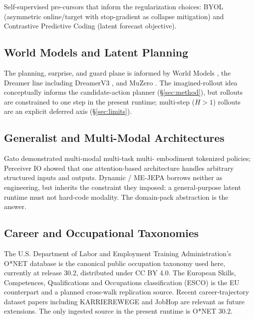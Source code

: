 \documentclass[10pt,twocolumn,letterpaper]{article}
\begin{document}
Self-supervised pre-cursors that inform the regularization choices:
BYOL \cite{grill2020byol} (asymmetric online/target with
stop-gradient as collapse mitigation) and Contrastive Predictive
Coding \cite{vandenoord2019cpc} (latent forecast objective).

\subsection{World Models and Latent Planning}

The planning, surprise, and guard plane is informed by World Models
\cite{ha2018worldmodels}, the Dreamer line including DreamerV3
\cite{hafner2023dreamerv3}, and MuZero \cite{schrittwieser2019muzero}.
The imagined-rollout idea conceptually informs the candidate-action
planner (\S\ref{sec:method}), but rollouts are constrained to one
step in the present runtime; multi-step ($H{>}1$) rollouts are an
explicit deferred axis (\S\ref{sec:limits}).

\subsection{Generalist and Multi-Modal Architectures}

Gato \cite{reed2022gato} demonstrated multi-modal multi-task multi-
embodiment tokenized policies; Perceiver IO
\cite{jaegle2022perceiverio} showed that one attention-based
architecture handles arbitrary structured inputs and outputs.
Dynamic / ME-JEPA borrows neither as engineering, but inherits the
constraint they imposed: a general-purpose latent runtime must not
hard-code modality. The domain-pack abstraction is the answer.

\subsection{Career and Occupational Taxonomies}

The U.S. Department of Labor and Employment Training
Administration's O*NET database \cite{onet2026} is the canonical
public occupation taxonomy used here, currently at release 30.2,
distributed under CC BY 4.0. The European Skills, Competences,
Qualifications and Occupations classification (ESCO)
\cite{esco2025} is the EU counterpart and a planned cross-walk
replication source. Recent career-trajectory dataset papers including KARRIEREWEGE
\cite{senger2024karrierewege} and JobHop \cite{johary2025jobhop}
are relevant as future extensions. The only ingested source in the
present runtime is O*NET 30.2.
\end{document}
